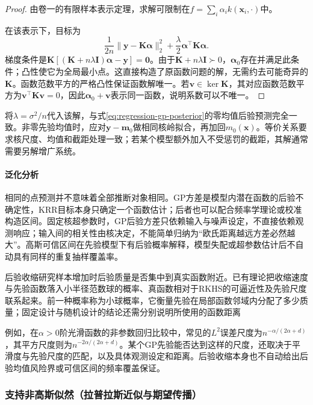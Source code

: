 \begin{proof}
由卷一的有限样本表示定理，求解可限制在$f=\sum_i\alpha_i k(\bm{x}_i,\cdot)$中。

在该表示下，目标为
\[
  \frac1{2n}\lVert\bm{y}-\bm{K}\bm{\alpha}\rVert_2^2
       +\frac{\lambda}{2}\bm{\alpha}^{\top}\bm{K}\bm{\alpha}.
\]
梯度条件是$\bm{K}[(\bm{K}+n\lambda\bm{I})\bm{\alpha}-\bm{y}]=\bm{0}$。由于$\bm{K}+n\lambda\bm{I}\succ0$，$\bm{\alpha}_0$存在并满足此条件；凸性使它为全局最小点。这直接构造了原函数问题的解，无需约去可能奇异的$\bm{K}$。函数范数平方的严格凸性保证函数解唯一。若$\bm{v}\in\ker\bm{K}$，其对应函数范数平方为$\bm{v}^{\top}\bm{K}\bm{v}=0$，因此$\bm{\alpha}_0+\bm{v}$表示同一函数，说明系数可以不唯一。
\end{proof}

将$\lambda=\sigma^2/n$代入该解，与式\eqref{eq:regression-gp-posterior}的零均值后验预测完全一致。非零先验均值时，应对$\bm{y}-\bm{m}_0$做相同核岭拟合，再加回$m_0(\bm{x})$。等价关系要求核尺度、均值和截距处理一致；若某个模型额外加入不受惩罚的截距，其解通常需要另解增广系统。

\paragraph{泛化分析}
相同的点预测并不意味着全部推断对象相同。GP方差是模型内潜在函数的后验不确定性，KRR目标本身只确定一个函数估计；后者也可以配合频率学理论或校准构造区间。固定核超参数时，GP后验方差只依赖输入与噪声设定，不直接依赖观测响应；输入间的相关性由核决定，不能简单归纳为“欧氏距离越远方差必然越大”。高斯可信区间在先验模型下有后验概率解释，模型失配或超参数估计后不自动具有同样的重复抽样覆盖率。

后验收缩研究样本增加时后验质量是否集中到真实函数附近。已有理论把收缩速度与先验函数落入小半径范数球的概率、真函数相对于RKHS的可逼近性及先验尺度联系起来。前一种概率称为小球概率，它衡量先验在局部函数邻域内分配了多少质量；固定设计与随机设计的结论还需分别说明所使用的函数距离

例如，在$\alpha>0$阶光滑函数的非参数回归比较中，常见的$L^2$误差尺度为$n^{-\alpha/(2\alpha+d)}$，其平方尺度则为$n^{-2\alpha/(2\alpha+d)}$。某个GP先验能否达到这样的尺度，还取决于平滑度与先验尺度的匹配，以及具体观测设定和距离。后验收缩本身也不自动给出后验均值风险界或可信区间的频率覆盖保证。

\subsubsection{支持非高斯似然（拉普拉斯近似与期望传播）}
\label{sec:regression-gp-nongaussian}

